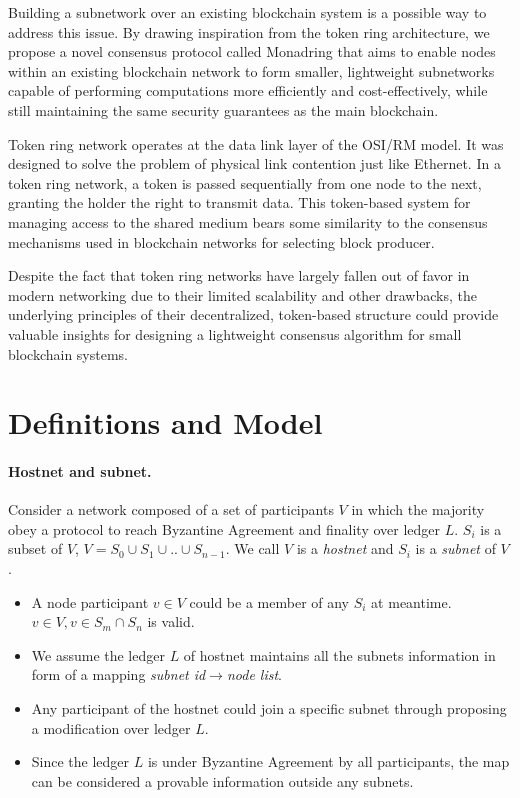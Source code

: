 \documentclass[11pt]{article}
\begin{document}
Building a subnetwork over an existing blockchain system is a possible way to address this issue.
By drawing inspiration from the token ring architecture, we propose a novel consensus protocol called Monadring that aims to enable nodes within an existing blockchain network to form smaller, lightweight subnetworks capable of performing computations more efficiently and cost-effectively, while still maintaining the same security guarantees as the main blockchain.

Token ring network operates at the data link layer of the OSI/RM model.
It was designed to solve the problem of physical link contention just like Ethernet.
In a token ring network, a token is passed sequentially from one node to the next, granting the holder the right to transmit data.
This token-based system for managing access to the shared medium bears some similarity to the consensus mechanisms used in blockchain networks for selecting block producer.

Despite the fact that token ring networks have largely fallen out of favor in modern networking due to their limited scalability and other drawbacks, the underlying principles of their decentralized, token-based structure could provide valuable insights for designing a lightweight consensus algorithm for small blockchain systems.

\section{Definitions and Model}
\paragraph{Hostnet and subnet.}
Consider a network composed of a set of participants $V$ in which the majority obey a protocol to reach Byzantine Agreement and finality\cite{grandpa} over ledger $L$. $S_{i}$ is a subset of $V$, \( V = S_{0} \cup S_{1} \cup .. \cup S_{n-1}  \). We call $V$ is a \textit{hostnet} and $S_{i}$ is a \textit{subnet} of $V$.
\begin{itemize}
\item A node participant \( v \in V \) could be a member of any $S_{i}$ at meantime.\( v \in V, v \in S_{m} \cap S_{n} \) is valid.
\item We assume the ledger $L$ of hostnet maintains all the subnets information in form of a mapping \textit{subnet id}\( \rightarrow \)\textit{node list}.
\item Any participant of the hostnet could join a specific subnet through proposing a modification over ledger $L$.
\item Since the ledger $L$ is under Byzantine Agreement by all participants, the map can be considered a provable information outside any subnets.
\end{itemize}
\end{document}
